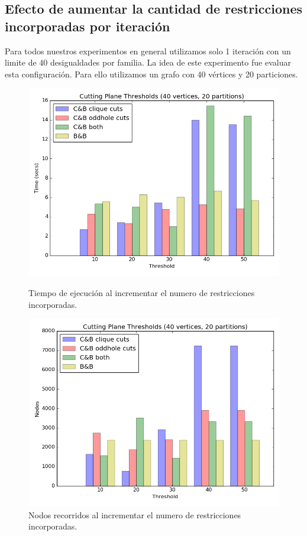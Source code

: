 \pagebreak

\subsection{Efecto de aumentar la cantidad de restricciones incorporadas por iteración}

Para todos nuestros experimentos en general utilizamos solo 1 iteración con un limite de 40 desigualdades por familia. La idea de este experimento fue evaluar esta configuración. Para ello utilizamos un grafo con 40 vértices y 20 particiones.

\begin{figure}[h]
  \centering
  \begin{minipage}[b]{0.49\textwidth}
    \includegraphics[width=\textwidth]{img/6-thresholds_v40_p20_i1_t1_b0.png}
    \caption{Tiempo de ejecución al incrementar el numero de restricciones incorporadas.}
  \end{minipage}
  \hfill
  \begin{minipage}[b]{0.49\textwidth}
    \includegraphics[width=\textwidth]{img/6-thresholds_v40_p20_i1_co2_t1_b0_nodes.png}
    \caption{Nodos recorridos al incrementar el numero de restricciones incorporadas.}
  \end{minipage}
\end{figure}

